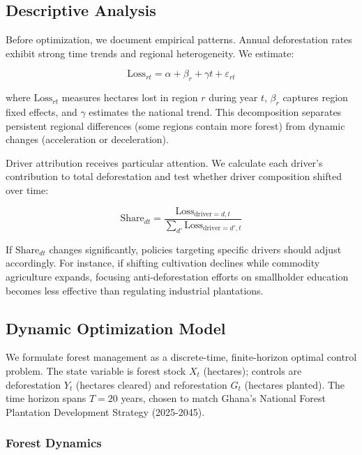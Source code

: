 \subsection{Descriptive Analysis}

Before optimization, we document empirical patterns. Annual deforestation rates exhibit strong time trends and regional heterogeneity. We estimate:

\begin{equation}
\text{Loss}_{rt} = \alpha + \beta_r + \gamma t + \varepsilon_{rt}
\end{equation}

where $\text{Loss}_{rt}$ measures hectares lost in region $r$ during year $t$, $\beta_r$ captures region fixed effects, and $\gamma$ estimates the national trend. This decomposition separates persistent regional differences (some regions contain more forest) from dynamic changes (acceleration or deceleration).

Driver attribution receives particular attention. We calculate each driver's contribution to total deforestation and test whether driver composition shifted over time:

\begin{equation}
\text{Share}_{dt} = \frac{\text{Loss}_{\text{driver}=d, t}}{\sum_{d'} \text{Loss}_{\text{driver}=d', t}}
\end{equation}

If $\text{Share}_{dt}$ changes significantly, policies targeting specific drivers should adjust accordingly. For instance, if shifting cultivation declines while commodity agriculture expands, focusing anti-deforestation efforts on smallholder education becomes less effective than regulating industrial plantations.

\subsection{Dynamic Optimization Model}

We formulate forest management as a discrete-time, finite-horizon optimal control problem. The state variable is forest stock $X_t$ (hectares); controls are deforestation $Y_t$ (hectares cleared) and reforestation $G_t$ (hectares planted). The time horizon spans $T = 20$ years, chosen to match Ghana's National Forest Plantation Development Strategy (2025-2045).

\subsubsection{Forest Dynamics}

